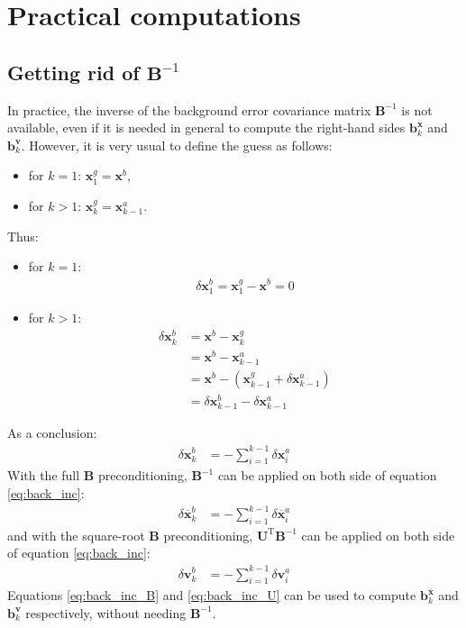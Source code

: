 \documentclass[12pt]{scrartcl}
\begin{document}
\section{Practical computations}

\subsection{Getting rid of $\mathbf{B}^{-1}$}
In practice, the inverse of the background error covariance matrix $\mathbf{B}^{-1}$ is not available, even if it is needed in general to compute the right-hand sides $\mathbf{b}^{\overline{\mathbf{x}}}_k$ and $\mathbf{b}^\mathbf{v}_k$. However, it is very usual to define the guess as follows:
\begin{itemize}
\item for $k = 1$: $\mathbf{x}^g_1 = \mathbf{x}^b$,
\item for $k > 1$: $\mathbf{x}^g_k = \mathbf{x}^a_{k-1}$.
\end{itemize}
Thus:
\begin{itemize}
\item for $k = 1$:
\begin{align}
\delta \mathbf{x}^b_1 = \mathbf{x}^g_1 - \mathbf{x}^b = 0
\end{align}
\item for $k > 1$:
\begin{align}
\delta \mathbf{x}^b_k & = \mathbf{x}^b - \mathbf{x}^g_k \nonumber \\
& = \mathbf{x}^b - \mathbf{x}^a_{k-1} \nonumber \\
& = \mathbf{x}^b - \left(\mathbf{x}^g_{k-1} + \delta \mathbf{x}^a_{k-1}\right) \nonumber \\
& = \delta \mathbf{x}^b_{k-1} - \delta \mathbf{x}^a_{k-1}
\end{align}
\end{itemize}
As a conclusion:
\begin{align}
\label{eq:back_inc}
\delta \mathbf{x}^b_k & = - \sum_{i=1}^{k-1} \delta \mathbf{x}^a_i
\end{align}
With the full $\mathbf{B}$ preconditioning, $\mathbf{B}^{-1}$ can be applied on both side of equation \eqref{eq:back_inc}:
\begin{align}
\label{eq:back_inc_B}
\delta \overline{\mathbf{x}}^b_k & = - \sum_{i=1}^{k-1} \delta \overline{\mathbf{x}}^a_i
\end{align}
and with the square-root $\mathbf{B}$ preconditioning, $\mathbf{U}^\mathrm{T} \mathbf{B}^{-1}$ can be applied on both side of equation \eqref{eq:back_inc}:
\begin{align}
\label{eq:back_inc_U}
\delta \mathbf{v}^b_k & = - \sum_{i=1}^{k-1} \delta \mathbf{v}^a_i
\end{align}
Equations \eqref{eq:back_inc_B} and \eqref{eq:back_inc_U} can be used to compute $\mathbf{b}^{\overline{\mathbf{x}}}_k$ and $\mathbf{b}^\mathbf{v}_k$ respectively, without needing $\mathbf{B}^{-1}$.
\end{document}
